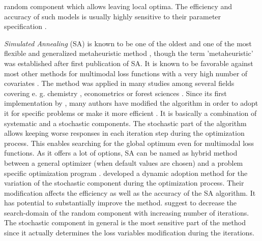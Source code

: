 random component which allows leaving local optima. The efficiency and accuracy of such models is usually highly sensitive to their parameter specification \citep{corana_1987}.

\textit{Simulated Annealing} (SA) \citep{kirkpatrick_1983} is known to be one of the oldest and one of the most flexible and generalized metaheuristic method \citep{blum_2003}, though the term 'metaheuristic' was established after first publication of SA. It is known to be favorable against most other methods for multimodal loss functions with a very high number of covariates \citep{corana_1987}. The method was applied in many studies among several fields covering e. g. chemistry \citep{agostini_2006}, econometrics \citep{ingber_1993} or forest sciences \citep{baskent_2002}. Since its first implementation by \citet{kirkpatrick_1983}, many authors have modified the algorithm in order to adopt it for specific problems \citep[e. g.][]{desarbo_1989, goffe_1996} or make it more efficient \citep[e. g.][]{xiang_2013}. It is basically a combination of systematic and a stochastic components. The stochastic part of the algorithm allows keeping worse responses in each iteration step during the optimization process. This enables searching for the global optimum even for multimodal loss functions. As it offers a lot of options, SA can be named as hybrid method between a general optimizer (when default values are chosen) and a problem specific optimization program \citep{wegener_2005}. \citet{corana_1987} developed a dynamic adoption method for the variation of the stochastic component during the optimization process. Their modification affects the efficiency as well as the accuracy of the SA algorithm. It has potential to substantially improve the method. \citet{pronzato_1984} suggest to decrease the search-domain of the random component with increasing number of iterations. The stochastic component in general is the most sensitive part of the method since it actually determines the loss variables modification during the iterations.

